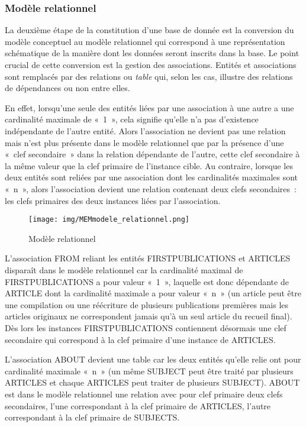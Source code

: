 \documentclass[12pt, a4paper]{article}
\begin{document}
\subsubsection{Modèle relationnel}
\label{ref:db_modele_relationnel}
La deuxième étape de la constitution d'une base de donnée est la conversion du modèle conceptuel au modèle relationnel qui correspond à une représentation schématique de la manière dont les données seront inscrits dans la base. Le point crucial de cette conversion est la gestion des associations. Entités et associations sont remplacés par des relations ou \textit{table} qui, selon les cas, illustre des relations de dépendances ou non entre elles.

En effet, lorsqu'une seule des entités liées par une association à une autre a une cardinalité maximale de «~1~», cela signifie qu'elle n'a pas d'existence indépendante de l'autre entité. Alors l'association ne devient pas une relation mais n'est plus présente dans le modèle relationnel que par la présence d'une «~clef secondaire~» dans la relation dépendante de l'autre, cette clef secondaire à la même valeur que la clef primaire de l'instance cible.
Au contraire, lorsque les deux entités sont reliées par une association dont les cardinalités maximales sont «~n~», alors l'association devient une relation contenant deux clefs secondaires~: les clefs primaires des deux instances liées par l'association.

\begin{figure}[H]
    \centering
    \texttt{[image: img/MEMmodele\_relationnel.png]}
    \caption{Modèle relationnel}
    \label{relationnel}
\end{figure}

L'association FROM reliant les entités FIRSTPUBLICATIONS et ARTICLES disparaît dans le modèle relationnel car la cardinalité maximal de FIRSTPUBLICATIONS a pour valeur «~1~», laquelle est donc dépendante de ARTICLE dont la cardinalité maximale a pour valeur «~n~» (un article peut être une compilation ou une réécriture de plusieurs publications premières mais les articles originaux ne correspondent jamais qu'à un seul article du recueil final). Dès lors les instances FIRSTPUBLICATIONS contiennent désormais une clef secondaire qui correspond à la clef primaire d'une instance de ARTICLES.

L'association ABOUT devient une table car les deux entités qu'elle relie ont pour cardinalité maximale «~n~» (un même SUBJECT peut être traité par plusieurs ARTICLES et chaque ARTICLES peut traiter de plusieurs SUBJECT). ABOUT est dans le modèle relationnel une relation avec pour clef primaire deux clefs secondaires, l'une correspondant à la clef primaire de ARTICLES, l'autre correspondant à la clef primaire de SUBJECTS.
\end{document}
